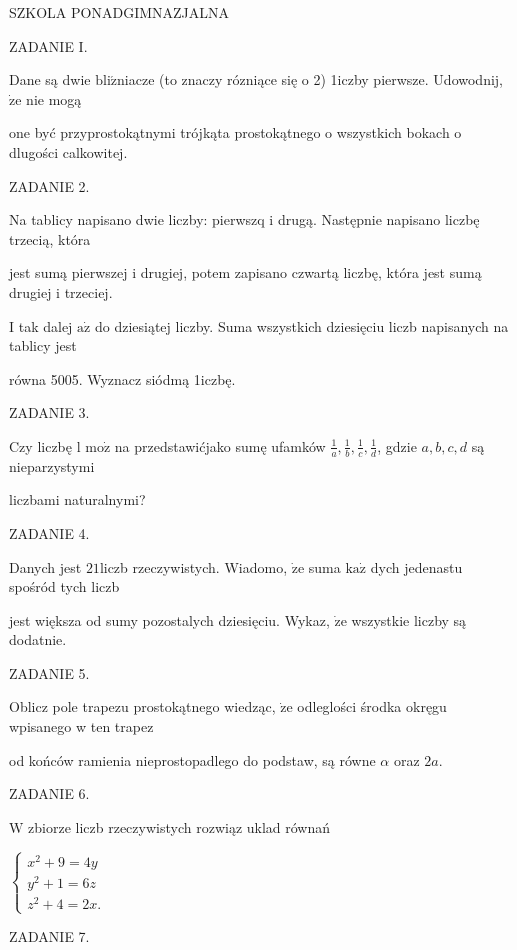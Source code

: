 \documentclass[a4paper,12pt]{article}
\begin{document}
SZKOLA PONADGIMNAZJALNA

ZADANIE I.

Dane są dwie $\mathrm{b}\mathrm{l}\mathrm{i}\acute{\mathrm{z}}$niacze (to znaczy rózniące się o 2) 1iczby pierwsze. Udowodnij, $\dot{\mathrm{z}}\mathrm{e}$ nie mogą

one być przyprostokątnymi trójkąta prostokątnego o wszystkich bokach o dlugości calkowitej.

ZADANIE 2.

Na tablicy napisano dwie liczby: pierwszq i drugą. Następnie napisano liczbę trzecią, która

jest sumą pierwszej i drugiej, potem zapisano czwartą liczbę, która jest sumą drugiej i trzeciej.

I tak dalej $\mathrm{a}\dot{\mathrm{z}}$ do dziesiątej liczby. Suma wszystkich dziesięciu liczb napisanych na tablicy jest

równa 5005. Wyznacz siódmą 1iczbę.

ZADANIE 3.

Czy liczbę l $\mathrm{m}\mathrm{o}\dot{\mathrm{z}}$ na przedstawićjako sumę ufamków $\displaystyle \frac{1}{a}, \displaystyle \frac{1}{b}, \displaystyle \frac{1}{c}, \displaystyle \frac{1}{d}$, gdzie $a, b, c, d$ są nieparzystymi

liczbami naturalnymi?

ZADANIE 4.

Danych jest $21$liczb rzeczywistych. Wiadomo, $\dot{\mathrm{z}}\mathrm{e}$ suma $\mathrm{k}\mathrm{a}\dot{\mathrm{z}}$ dych jedenastu spośród tych liczb

jest większa od sumy pozostalych dziesięciu. Wykaz, $\dot{\mathrm{z}}\mathrm{e}$ wszystkie liczby są dodatnie.

ZADANIE 5.

Oblicz pole trapezu prostokątnego wiedząc, $\dot{\mathrm{z}}\mathrm{e}$ odleglości środka okręgu wpisanego w ten trapez

od końców ramienia nieprostopadlego do podstaw, są równe $\alpha$ oraz $2a.$

ZADANIE 6.

$\mathrm{W}$ zbiorze liczb rzeczywistych rozwiąz uklad równań

$\left\{\begin{array}{l}
x^{2}+9=4y\\
y^{2}+1=6z\\
z^{2}+4=2x.
\end{array}\right.$

ZADANIE 7.
\end{document}
